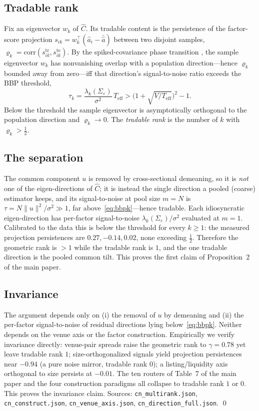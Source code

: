 \documentclass[12pt]{article}
\theoremstyle{plain}
\theoremstyle{definition}
\begin{document}
\subsection*{Tradable rank}
Fix an eigenvector $w_k$ of $\widehat C$. Its tradable content is the persistence
of the factor-score projection $s_{ik}=w_k^\top(\widehat a_i-\bar{\widehat a})$
between two disjoint samples, $\varrho_k=\mathrm{corr}(s^{\text{tr}}_{ik},
s^{\text{te}}_{ik})$. By the spiked-covariance phase transition
\citep{BaikBenArousPeche2005,Paul2007,BenaychNadakuditi2011}, the sample
eigenvector $w_k$ has nonvanishing overlap with a population direction---hence
$\varrho_k$ bounded away from zero---iff that direction's signal-to-noise ratio
exceeds the BBP threshold,
\begin{equation}
\tau_k=\frac{\lambda_k(\Sigma_\varepsilon)}{\sigma^2}\,T_{\mathrm{eff}}>
\Big(1+\sqrt{V/T_{\mathrm{eff}}}\Big)^2-1 .
\label{eq:bbpk}
\end{equation}
Below the threshold the sample eigenvector is asymptotically orthogonal to the
population direction and $\varrho_k\to 0$. The \emph{tradable rank} is the number
of $k$ with $\varrho_k>\tfrac12$.

\subsection*{The separation}
The common component $u$ is removed by cross-sectional demeaning, so it is
\emph{not} one of the eigen-directions of $\widehat C$; it is instead the single
direction a pooled (coarse) estimator keeps, and its signal-to-noise at pool size
$m=N$ is $\tau=N\|u\|^2/\sigma^2\gg1$, far above~\eqref{eq:bbpk}---hence tradable.
Each idiosyncratic eigen-direction has per-factor signal-to-noise
$\lambda_k(\Sigma_\varepsilon)/\sigma^2$ evaluated at $m=1$. Calibrated to the
data this is below the threshold for every $k\ge1$: the measured projection
persistences are $0.27,-0.14,0.02$, none exceeding $\tfrac12$. Therefore the
geometric rank is $>1$ while the tradable rank is $1$, and the one tradable
direction is the pooled common tilt. This proves the first claim of
Proposition~2 of the main paper.

\subsection*{Invariance}
The argument depends only on (i) the removal of $u$ by demeaning and (ii) the
per-factor signal-to-noise of residual directions lying below~\eqref{eq:bbpk}.
Neither depends on the venue axis or the factor construction. Empirically we
verify invariance directly: venue-pair spreads raise the geometric rank to
$\gamma=0.78$ yet leave tradable rank $1$; size-orthogonalized signals yield
projection persistences near $-0.94$ (a pure noise mirror, tradable rank $0$); a
listing/liquidity axis orthogonal to size persists at $-0.01$. The ten routers of
Table~7 of the main paper and the four construction paradigms all collapse to tradable
rank $1$ or $0$. This proves the invariance claim. Sources:
\texttt{cn\_multirank.json}, \texttt{cn\_construct.json},
\texttt{cn\_venue\_axis.json}, \texttt{cn\_direction\_full.json}. \qed

\clearpage

\end{document}
